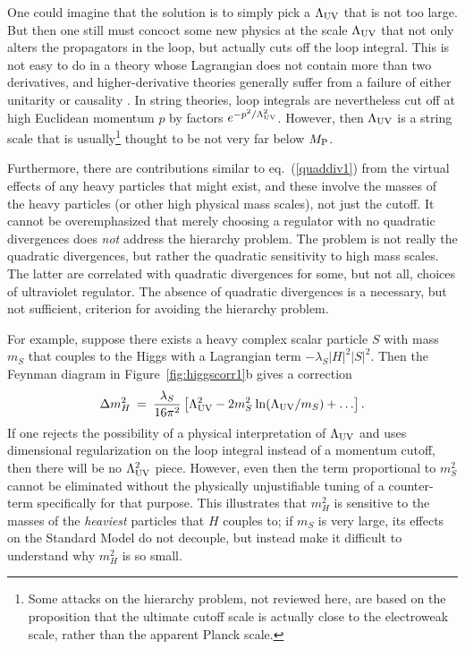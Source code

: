 \documentclass[12pt]{article}
\def\beq{\begin{eqnarray}}
\def\eeq{\end{eqnarray}}
\def\MPlanck{M_{\rm P}}
\begin{document}
One could imagine that the solution is to simply pick a $\Lambda_{\rm UV}$
that is not too large. But then one still must concoct some new physics at
the scale $\Lambda_{\rm UV}$ that not only alters the propagators in the
loop, but actually cuts off the loop integral. This is not easy to do in a
theory whose Lagrangian does not contain more than two derivatives, and
higher-derivative theories generally suffer from a failure of either
unitarity or causality \cite{EliezerWoodard}. In string theories, loop
integrals are nevertheless cut off at high Euclidean momentum $p$ by
factors $e^{-p^2/\Lambda^2_{\rm UV}}$.  However, then $\Lambda_{\rm UV}$
is a string scale that is usually\footnote{Some attacks on the
hierarchy problem, not reviewed here, 
are based on the proposition that the ultimate cutoff
scale is actually close to the electroweak scale, rather 
than the apparent Planck scale.} thought to
be not very far below $\MPlanck$. 

Furthermore, there are contributions similar to eq.~(\ref{quaddiv1}) from the virtual 
effects of any heavy particles that might exist, and these involve
the masses of the heavy particles (or other high physical mass scales), 
not just the cutoff. It cannot be overemphasized that merely choosing 
a regulator with no quadratic divergences does {\em not} address the hierarchy problem. 
The problem is not really the quadratic divergences, but rather the quadratic sensitivity 
to high mass scales. The latter are correlated with quadratic divergences for some, 
but not all, choices of ultraviolet regulator. The absence of quadratic divergences 
is a necessary, but not sufficient, criterion for avoiding the hierarchy problem.

For example, suppose there exists a heavy complex scalar particle $S$ with
mass $m_S$ that couples to the Higgs with a Lagrangian term $ -\lambda_S
|H|^2 |S|^2$. Then the Feynman diagram in Figure~\ref{fig:higgscorr1}b
gives a correction
\beq
\Delta m_H^2 \>=\> {\lambda_S\over 16 \pi^2}
\left [\Lambda_{\rm UV}^2 - 2 m_S^2
\> {\rm ln}(\Lambda_{\rm UV}/m_S) + \ldots
\right ].
\label{quaddiv2}
\eeq
If one rejects the possibility of a physical interpretation of
$\Lambda_{\rm UV}$ and uses dimensional regularization on the loop
integral instead of a momentum cutoff, then there will be no $\Lambda_{\rm
UV}^2$ piece. However, even then the term proportional to $m_S^2$ cannot
be eliminated without the physically unjustifiable tuning of a
counter-term specifically for that purpose. This illustrates that 
$m_H^2$ is sensitive to the
masses of the {\it heaviest} particles that $H$ couples to; if $m_S$ is
very large, its effects on the Standard Model do not decouple, but instead
make it difficult to understand why $m_H^2$ is so small. 
\end{document}
